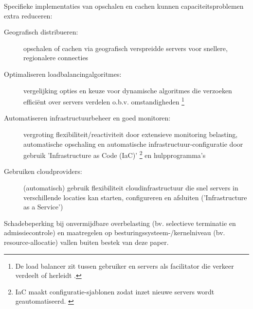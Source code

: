 Specifieke implementaties van opschalen en cachen kunnen capaciteitsproblemen
extra reduceren:

\begin{description}
    \item [Geografisch distribueren:] opschalen of cachen via
    geografisch verspreidde servers voor snellere, regionalere connecties
    \cite{sivasubramanian2007analysis, chenhao2017mitigating,
    colajanni1998dynamic}
    
    \item [Optimaliseren loadbalancingalgoritmes:] vergelijking opties 
    en keuze voor dynamische algoritmes die verzoeken efficiënt over
    servers verdelen o.b.v. omstandigheden
    \cite{mourad1997scalable, zhou2023comparative, amazon2023whatisload}
    \footnote{De load balancer zit tussen gebruiker en servers als
    facilitator die verkeer verdeelt of herleidt \cite{amazon2023whatisload}.}

    \item [Automatiseren infrastructuurbeheer en goed monitoren:] vergroting
    flexibiliteit/reactiviteit door extensieve monitoring belasting,
    automatische opschaling en automatische infrastructuur-configuratie
    door gebruik 'Infrastructure as Code (IaC)'
    \footnote{IaC maakt configuratie-sjablonen zodat inzet nieuwe
    servers wordt geautomatiseerd. \cite{microsoft2023wat}}
    en hulpprogramma's \cite{microsoft2023wat}
    
    \item [Gebruiken cloudproviders:] (automatisch) gebruik flexibiliteit
    cloudinfrastructuur die snel
    servers in verschillende locaties
    kan starten, configureren en afsluiten ('Infrastructure as a Service') 
    \cite{microsoft2023wat, gandhi2018modeldriven, hwang2014scaleout,
    chenhao2017mitigating}

\end{description}

Schadebeperking bij onvermijdbare overbelasting
(bv. selectieve terminatie en admissiecontrole) en maatregelen op
besturingssysteem-/kernelniveau (bv. resource-allocatie)
vallen buiten bestek van deze paper.